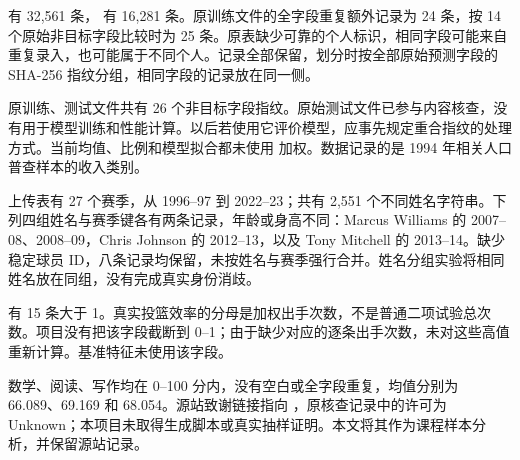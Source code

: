  有 32,561 条， 有 16,281 条。原训练文件的全字段重复额外记录为 24 条，按 14 个原始非目标字段比较时为 25 条。原表缺少可靠的个人标识，相同字段可能来自重复录入，也可能属于不同个人。记录全部保留，划分时按全部原始预测字段的 SHA-256 指纹分组，相同字段的记录放在同一侧。

原训练、测试文件共有 26 个非目标字段指纹。原始测试文件已参与内容核查，没有用于模型训练和性能计算。以后若使用它评价模型，应事先规定重合指纹的处理方式。当前均值、比例和模型拟合都未使用  加权。数据记录的是 1994 年相关人口普查样本的收入类别\citep{adult}。

上传表有 27 个赛季，从 1996--97 到 2022--23；共有 2,551 个不同姓名字符串。下列四组姓名与赛季键各有两条记录，年龄或身高不同：Marcus Williams 的 2007--08、2008--09，Chris Johnson 的 2012--13，以及 Tony Mitchell 的 2013--14。缺少稳定球员 ID，八条记录均保留，未按姓名与赛季强行合并。姓名分组实验将相同姓名放在同组，没有完成真实身份消歧。

 有 15 条大于 1。真实投篮效率的分母是加权出手次数，不是普通二项试验总次数\citep{nbaglossary}。项目没有把该字段截断到 0--1；由于缺少对应的逐条出手次数，未对这些高值重新计算。基准特征未使用该字段。

数学、阅读、写作均在 0--100 分内，没有空白或全字段重复，均值分别为 66.089、69.169 和 68.054。源站致谢链接指向 ，原核查记录中的许可为 Unknown；本项目未取得生成脚本或真实抽样证明。本文将其作为课程样本分析，并保留源站记录\citep{student}。

